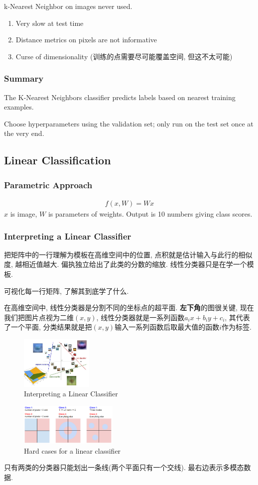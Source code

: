 k-Nearest Neighbor on images never used.
\begin{enumerate}
    \item Very slow at test time
    \item Distance metrics on pixels are not informative
    \item Curse of dimensionality (训练的点需要尽可能覆盖空间, 但这不太可能)
\end{enumerate}

\subsubsection{Summary}
The K-Nearest Neighbors classifier predicts labels based on nearest training examples. 

Choose hyperparameters using the validation set; only run on the test set once at the very end. 

\subsection{Linear Classification}
\subsubsection{Parametric Approach}
\begin{align*}
    f(x, W)=Wx
\end{align*}
$x$ is image, $W$ is parameters of weights. Output is 10 numbers giving class scores. 

\subsubsection{Interpreting a Linear Classifier}

把矩阵中的一行理解为模板在高维空间中的位置, 点积就是估计输入与此行的相似度, 越相近值越大. 偏执独立给出了此类的分数的缩放. 线性分类器只是在学一个模板. 

可视化每一行矩阵, 了解其到底学了什么. 

在高维空间中, 线性分类器是分割不同的坐标点的超平面. \textbf{左下角}的图很关键, 现在我们把图片点视为二维$(x,y)$, 线性分类器就是一系列函数$a_i x+b_iy+c_i$, 其代表了一个平面, 分类结果就是把$(x,y)$输入一系列函数后取最大值的函数$i$作为标签. 
\begin{figure}[!htb]
    \centering
    \includegraphics[width=0.309\textwidth]{pic/Lec2/Interpreting a Linear Classifier}
    \caption{Interpreting a Linear Classifier}
\end{figure}

\begin{figure}[!htb]
    \centering
    \includegraphics[width=0.42\textwidth]{pic/Lec2/Hard cases for a linear classifier}
    \caption{Hard cases for a linear classifier}
\end{figure}
只有两类的分类器只能划出一条线(两个平面只有一个交线). 最右边表示多模态数据. 